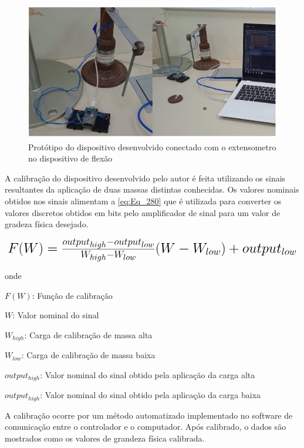 \begin{figure}[htb]
	\caption{\label{fig:2070} Protótipo do dispositivo desenvolvido conectado com o extensometro no dispositivo de flexão}
	\begin{center}
		\includegraphics[width=\textwidth]{pictures/2070.png}
	\end{center}
\end{figure}

A calibração do dispositivo desenvolvido pelo autor é feita utilizando os sinais resultantes da aplicação de duas massas distintas conhecidas.
Os valores nominais obtidos nos sinais alimentam a \autoref{eq:Eq_280} que é utilizada para converter os valores discretos obtidos em bits pelo
amplificador de sinal para um valor de gradeza física desejado.

\begin{equation}\label{eq:Eq_280}%
\mbox{\fontsize{17.28}{21.6}\selectfont\( %
F(W) = \frac{output_{high}-output_{low}}{W_{high}-W_{low}}(W - W_{low}) + output_{low}
\)} %
\end{equation}

onde

$F(W)$: Função de calibração

$W$: Valor nominal do sinal

$W_{high}$: Carga de calibração de massa alta

$W_{low}$: Carga de calibração de massa baixa

$output_{high}$: Valor nominal do sinal obtido pela aplicação da carga alta

$output_{high}$: Valor nominal do sinal obtido pela aplicação da carga baixa

\hfill

A calibração ocorre por um método automatizado implementado no software de comunicação entre o controlador e o computador.
Após calibrado, o dados são mostrados como os valores de grandeza física calibrada.

